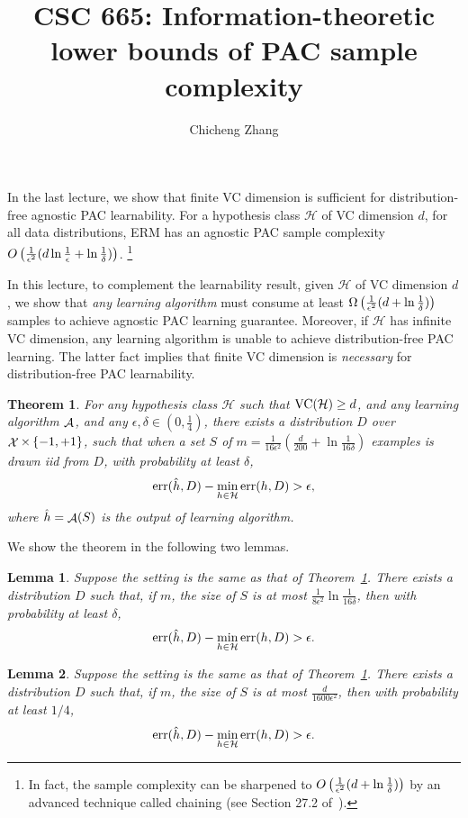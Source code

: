 \documentclass{article}
\title{CSC 665: Information-theoretic lower bounds of PAC sample complexity}
\author{Chicheng Zhang}
\newtheorem{theorem}{Theorem}
\newtheorem{lemma}{Lemma}
\DeclareMathOperator*{\err}{{\rm err}}
\DeclareMathOperator*{\Xcal}{{\cal X}}
\DeclareMathOperator*{\Acal}{{\cal A}}
\DeclareMathOperator*{\VC}{{\rm VC}}
\newcommand{\Hcal}{\mathcal{H}}
\begin{document}
\maketitle

In the last lecture, we show that finite VC dimension is
sufficient for distribution-free agnostic PAC learnability.
For a hypothesis class $\Hcal$
of VC dimension $d$, for all data distributions,
ERM has an agnostic PAC sample complexity
$O\del{\frac{1}{\epsilon^2}(d \ln\frac1\epsilon + \ln\frac1\delta)}$.
\footnote{In fact, the sample complexity can be sharpened to
$O\del{\frac{1}{\epsilon^2}(d + \ln\frac1\delta)}$ by an
advanced technique called chaining (see Section 27.2
of~\cite{shalev2014understanding}).}

In this lecture, to complement the learnability result, given $\Hcal$
of VC dimension $d$,
we show that {\em any learning algorithm} must consume at least
$\Omega\del{\frac{1}{\epsilon^2}(d + \ln\frac1\delta)}$ samples to achieve agnostic
PAC learning guarantee. Moreover, if $\Hcal$ has infinite VC dimension,
any learning algorithm is unable to achieve distribution-free PAC learning.
The latter fact implies that finite VC dimension is {\em necessary} for
distribution-free PAC learnability.

\begin{theorem}
For any hypothesis class $\Hcal$ such that $\VC(\Hcal)\geq d$,
and any learning algorithm $\Acal$, and any $\epsilon,\delta \in (0,\frac14)$,
there exists a distribution $D$ over $\Xcal \times \cbr{-1,+1}$, such that
when a set $S$ of $m = \frac{1}{16\epsilon^2}(\frac{d}{200} + \ln\frac1{16\delta})$ examples is drawn iid from
$D$, with probability at least $\delta$,
\[ \err(\hat{h}, D) - \min_{h \in \Hcal} \err(h, D) > \epsilon, \]
where $\hat{h} = \Acal(S)$ is the output of learning algorithm.
\label{thm:lb}
\end{theorem}

We show the theorem in the following two lemmas.

\begin{lemma}
Suppose the setting is the same as that of Theorem~\ref{thm:lb}. There exists
a distribution $D$ such that, if $m$,
the size of $S$ is at most $\frac{1}{8\epsilon^2}\ln\frac1{16\delta}$,
then with probability at least $\delta$,
\[ \err(\hat{h}, D) - \min_{h \in \Hcal} \err(h, D) > \epsilon. \]
\label{lem:delta}
\end{lemma}

\begin{lemma}
Suppose the setting is the same as that of Theorem~\ref{thm:lb}. There exists
a distribution $D$ such that, if $m$,
the size of $S$ is at most $\frac{d}{1600\epsilon^2}$, then with probability at least
$1/4$,
\[ \err(\hat{h}, D) - \min_{h \in \Hcal} \err(h, D) > \epsilon. \]
\label{lem:d}
\end{lemma}
\end{document}
